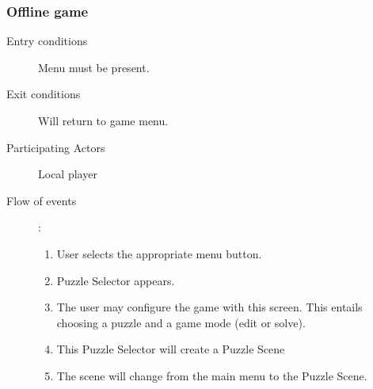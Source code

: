 \documentclass[12pt]{article}
\begin{document}
    \subsubsection{Offline game}
    \begin{description}
        \item[Entry conditions] Menu must be present.
        \item[Exit conditions] Will return to game menu.
        \item[Participating Actors] Local player
        \item[Flow of events]:
            \begin{enumerate}
                \item User selects the appropriate menu button.
                \item Puzzle Selector appears.
                \item The user may configure the game with this screen. This
                    entails choosing a puzzle and a game mode (edit or solve).
                \item This Puzzle Selector will create a Puzzle Scene
                \item The scene will change from the main menu to the Puzzle
                    Scene.
            \end{enumerate}
    \end{description}


\end{document}
